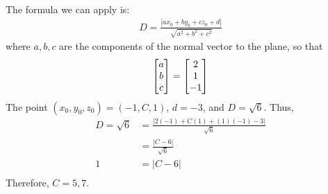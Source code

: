 \item 
{}\\
The formula we can apply is:
\begin{align*}
  D = \frac{| ax_0 + by_0 +cz_0 +d|}{\sqrt{a^2+b^2+c^2}}
\end{align*}
where $a, b, c$ are the components of the normal vector to the plane, so that
\begin{align*}
  \begin{bmatrix} a \\ b \\ c \end{bmatrix} = \begin{bmatrix} 2 \\ 1 \\ -1 \end{bmatrix}
\end{align*}
The point $(x_0,y_0,z_0) = (-1 , C, 1)$, $d = -3$, and $D = \sqrt{6}$. Thus,
\begin{align*}
  D = \sqrt{6} &= \frac{| 2(-1) + C(1) + (1)(-1) -3|}{\sqrt{6}}\\
  &= \frac{| C - 6|}{\sqrt{6}}\\
  1 &= | C - 6| \\
\end{align*}
Therefore, $C = 5, 7$.
\item  %
